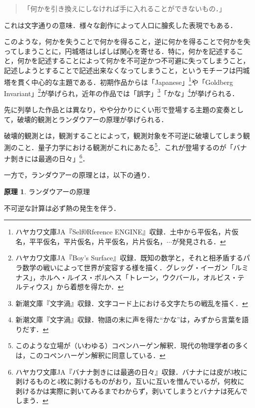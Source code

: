\documentclass[10pt, a5paper, twoside]{jsarticle}
\theoremstyle{definition}
\newtheorem{prn}{原理}
\begin{document}
			\begin{quote}

				「何かを引き換えにしなければ手に入れることができないもの．」
				
			\end{quote}

			これは文字通りの意味．様々な創作によって人口に膾炙した表現でもある．

			このような，何かを失うことで何かを得ること，逆に何かを得ることで何かを失ってしまうことに，円城塔はしばしば関心を寄せる．特に，何かを記述すること，何かを記述することによって何かを不可逆かつ不可避に失ってしまうこと，記述しようとすることで記述出来なくなってしまうこと，というモチーフは円城塔を貫く中心的な主題である．初期作品からは「Japanese」\footnote{ハヤカワ文庫JA『Self0Rference ENGINE』収録．土中から平仮名，片仮名，平平仮名，平片仮名，片平仮名，片片仮名，$\cdots$が発見される．}や「Goldberg Invariant」\footnote{ハヤカワ文庫JA『Boy's Surface』収録．既知の数学と，それと相矛盾するパラ数学の戦いによって世界が変容する様を描く．グレッグ・イーガン「ルミナス」，ホルへ・ルイス・ボルヘス「トレーン，ウクバール，オルビス・テルティウス」から着想を得たか．}が挙げられ，近年の作品では「誤字」\footnote{新潮文庫『文字渦』収録．文字コード上における文字たちの戦乱を描く．}「かな」\footnote{新潮文庫『文字渦』収録．物語の末に声を得た“かな”は，みずから言葉を語りだす．}が挙げられる．

			先に列挙した作品とは異なり，やや分かりにくい形で登場する主題の変奏として，破壊的観測とランダウアーの原理が挙げられる．

			破壊的観測とは，観測することによって，観測対象を不可逆に破壊してしまう観測のこと．量子力学における観測がこれにあたる\footnote{このような立場が（いわゆる）コペンハーゲン解釈．現代の物理学者の多くは，このコペンハーゲン解釈に同意している．}．これが登場するのが「バナナ剝きには最適の日々」\footnote{ハヤカワ文庫JA『バナナ剝きには最適の日々』収録．バナナには皮が3枚に剥けるものと4枚に剥けるものがおり，互いに互いを憎んでいるが，何枚に剥けるかは実際に剥いてみるまでわからず，剥いてしまうとバナナは死んでしまう．}．

			一方で，ランダウアーの原理とは，以下の通り．

			\begin{prn}

				ランダウアーの原理

				不可逆な計算は必ず熱の発生を伴う．
				
			\end{prn}
\end{document}
